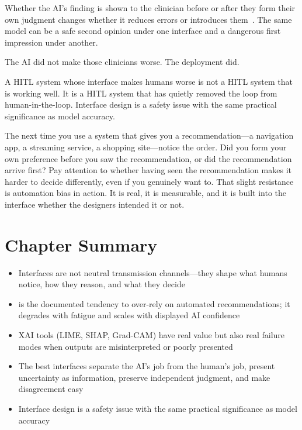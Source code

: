 Whether the AI's finding is shown to the clinician before or after they form their own judgment changes whether it reduces errors or introduces them~\autocite{pesapane2026cognitive}. The same model can be a safe second opinion under one interface and a dangerous first impression under another.

The AI did not make those clinicians worse. The deployment did.

\begin{keyconcept}
A HITL system whose interface makes humans worse is not a HITL system that is working well. It is a HITL system that has quietly removed the loop from human-in-the-loop. Interface design is a safety issue with the same practical significance as model accuracy.
\end{keyconcept}


\begin{trythis}
The next time you use a system that gives you a recommendation---a navigation app, a streaming service, a shopping site---notice the order. Did you form your own preference before you saw the recommendation, or did the recommendation arrive first? Pay attention to whether having seen the recommendation makes it harder to decide differently, even if you genuinely want to. That slight resistance is automation bias in action. It is real, it is measurable, and it is built into the interface whether the designers intended it or not.
\end{trythis}

\section*{Chapter Summary}

\begin{keyconcept}
\begin{itemize}
    \item Interfaces are not neutral transmission channels---they shape what humans notice, how they reason, and what they decide
    \item {} is the documented tendency to over-rely on automated recommendations; it degrades with fatigue and scales with displayed AI confidence
    \item XAI tools (LIME, SHAP, Grad-CAM) have real value but also real failure modes when outputs are misinterpreted or poorly presented
    \item The best interfaces separate the AI's job from the human's job, present uncertainty as information, preserve independent judgment, and make disagreement easy
    \item Interface design is a safety issue with the same practical significance as model accuracy
\end{itemize}
\end{keyconcept}

